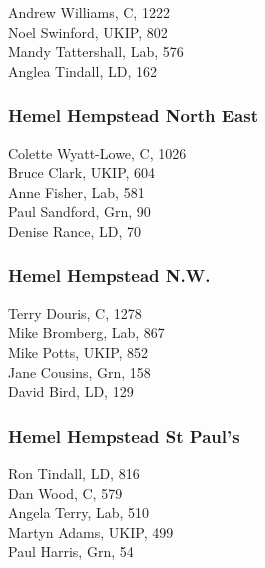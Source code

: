 \documentclass[a4paper,openany,10pt]{book}
\begin{document}


Andrew Williams, C, 1222\\
Noel Swinford, UKIP, 802\\
Mandy Tattershall, Lab, 576\\
Anglea Tindall, LD, 162\\


\subsubsection*{Hemel Hempstead North East}



Colette Wyatt-Lowe, C, 1026\\
Bruce Clark, UKIP, 604\\
Anne Fisher, Lab, 581\\
Paul Sandford, Grn, 90\\
Denise Rance, LD, 70\\


\subsubsection*{Hemel Hempstead N.W.}



Terry Douris, C, 1278\\
Mike Bromberg, Lab, 867\\
Mike Potts, UKIP, 852\\
Jane Cousins, Grn, 158\\
David Bird, LD, 129\\


\subsubsection*{Hemel Hempstead St Paul's}



Ron Tindall, LD, 816\\
Dan Wood, C, 579\\
Angela Terry, Lab, 510\\
Martyn Adams, UKIP, 499\\
Paul Harris, Grn, 54\\
\end{document}
